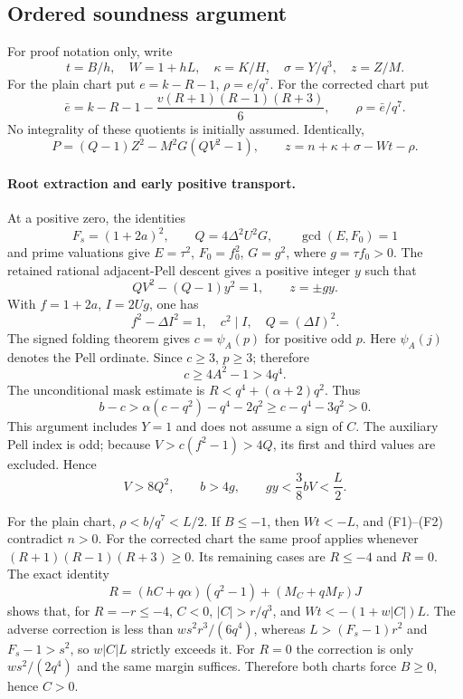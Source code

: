 \subsection{Ordered soundness argument}

For proof notation only, write
\[
 t=B/h,\quad W=1+hL,\quad \kappa=K/H,
 \quad \sigma=Y/q^3,\quad z=Z/M.
\]
For the plain chart put \(e=k-R-1\), \(\rho=e/q^7\).
For the corrected chart put
\[
 \bar e=k-R-1-\frac{v(R+1)(R-1)(R+3)}6,
 \qquad\rho=\bar e/q^7.
\]
No integrality of these quotients is initially assumed. Identically,
\[
 P=(Q-1)Z^2-M^2G(QV^2-1),\qquad
 z=n+\kappa+\sigma-Wt-\rho.                       \tag{F1}
\]

\paragraph{Root extraction and early positive transport.}
At a positive zero, the identities
\[
 F_s=(1+2a)^2,\qquad Q=4\Delta^2U^2G,
 \qquad\gcd(E,F_0)=1
\]
and prime valuations give \(E=\tau^2\), \(F_0=f_0^2\),
\(G=g^2\), where \(g=\tau f_0>0\). The retained rational
adjacent-Pell descent gives a positive integer \(y\) such that
\[
 QV^2-(Q-1)y^2=1,\qquad z=\pm gy.
\]
With \(f=1+2a\), \(I=2Ug\), one has
\[
 f^2-\Delta I^2=1,\quad c^2\mid I,\quad Q=(\Delta I)^2.
\]
The signed folding theorem gives \(c=\psi_A(p)\) for positive odd
\(p\). Here \(\psi_A(j)\) denotes the Pell ordinate. Since
\(c\ge3\), \(p\ge3\); therefore
\[
 c\ge4A^2-1>4q^4.
\]
The unconditional mask estimate is
\(R<q^4+(\alpha+2)q^2\). Thus
\[
 b-c>\alpha(c-q^2)-q^4-2q^2
       \ge c-q^4-3q^2>0.
\]
This argument includes \(Y=1\) and does not assume a sign of \(C\).
The auxiliary Pell index is odd; because
\(V>c(f^2-1)>4Q\), its first and third values are excluded. Hence
\[
 V>8Q^2,\qquad b>4g,\qquad gy<\frac{3}{8}bV<\frac L2.
                                                               \tag{F2}
\]

For the plain chart, \(\rho<b/q^7<L/2\). If \(B\le-1\),
then \(Wt<-L\), and (F1)--(F2) contradict \(n>0\).
For the corrected chart the same proof applies whenever
\((R+1)(R-1)(R+3)\ge0\). Its remaining cases are \(R\le-4\)
and \(R=0\). The exact identity
\[
 R=(hC+q\alpha)(q^2-1)+(M_C+qM_F)J
\]
shows that, for \(R=-r\le-4\),
\(C<0\), \(|C|>r/q^3\), and
\(Wt<-(1+w|C|)L\). The adverse correction is less than
\(ws^2r^3/(6q^4)\), whereas
\(L>(F_s-1)r^2\) and \(F_s-1>s^2\), so
\(w|C|L\) strictly exceeds it. For \(R=0\) the correction is
only \(ws^2/(2q^4)\) and the same margin suffices.
Therefore both charts force \(B\ge0\), hence \(C>0\).

